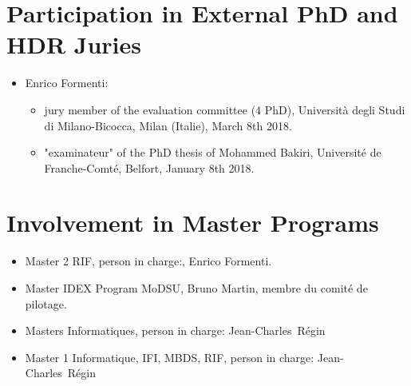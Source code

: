 \documentclass[a4paper]{article}
\newcommand{\nome}[1]{#1}
\newcommand{\cognome}[1]{#1}
\newcommand{\person}[2]{\nome{#1}\ \cognome{#2}\xspace}
\newcommand{\JCR}{\person{Jean-Charles}{Régin}}
\begin{document}
\section{Participation in External PhD and HDR Juries}
\begin{itemize}

\item Enrico Formenti:
\begin{itemize}
\item jury member of the evaluation committee (4 PhD), Università degli Studi di Milano-Bicocca, Milan (Italie), March 8th 2018.
    \item "examinateur" of the PhD thesis  of Mohammed Bakiri, Université de Franche-Comté, Belfort, January 8th 2018.
    \end{itemize}

\end{itemize}

\section{Involvement in Master Programs}
\begin{itemize}
 
 \item Master 2 RIF, person in charge:, Enrico Formenti.
 \item Master IDEX Program MoDSU, Bruno Martin, membre du comité de pilotage.
 
 \item Masters Informatiques, person in charge: \JCR
 \item Master 1 Informatique, IFI, MBDS, RIF, person in charge: \JCR
\end{itemize}
\end{document}

